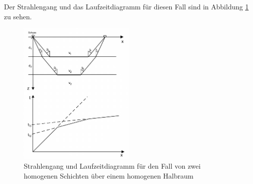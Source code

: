 Der Strahlengang und das Laufzeitdiagramm für diesen Fall sind in Abbildung \ref{fig:zweiSchichten} zu sehen.

\begin{figure}
 \centering
 \includegraphics[width=0.5\textwidth]{fig/zweischichten}
 \caption[Strahlengang und Laufzeitdiagramm für den Fall von zwei homogenen Schichten über einem homogenen Halbraum]{Strahlengang und Laufzeitdiagramm für den Fall von zwei homogenen Schichten über einem homogenen Halbraum \cite{skript}}
 \label{fig:zweiSchichten}
\end{figure}

